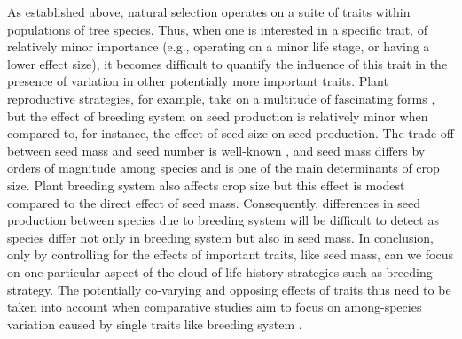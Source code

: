 \documentclass[b5paper,justified]{tufte-book} %
\begin{document}
\begin{fullwidth}
 
As established above, natural selection operates on a suite of traits within populations of tree species. Thus, when one is interested in a specific trait, of relatively minor importance (e.g., operating on a minor life stage, or having a lower effect size), it becomes difficult to quantify the influence of this trait in the presence of variation in other potentially more important traits. Plant reproductive strategies, for example, take on a multitude of fascinating forms \citep[see e.g.][]{Visser2011}, but the effect of breeding system on seed production is relatively minor when compared to, for instance, the effect of seed size on seed production. The trade-off  between seed mass and seed number is well-known \citep{Moles2006, Muller-Landau2008}, and seed mass differs by orders of magnitude among species \citep{Muller-Landau2010} and is one of the main determinants of crop size. Plant breeding system also affects crop size \citep{Queenborough2009} but this effect is modest compared to the direct effect of seed mass.  Consequently, differences in seed production between species due to breeding system will be difficult to detect as species differ not only in breeding system but also in seed mass. In conclusion, only by controlling for the effects of important traits, like seed mass, can we focus on one particular aspect of the cloud of life history strategies such as breeding strategy. The potentially co-varying and opposing effects of traits thus need to be taken into account when comparative studies aim to focus on among-species variation caused by single traits like breeding system \citep[see also][]{Laughlin2015}. \end{fullwidth} 

\bigskip
{} 
\end{document}
